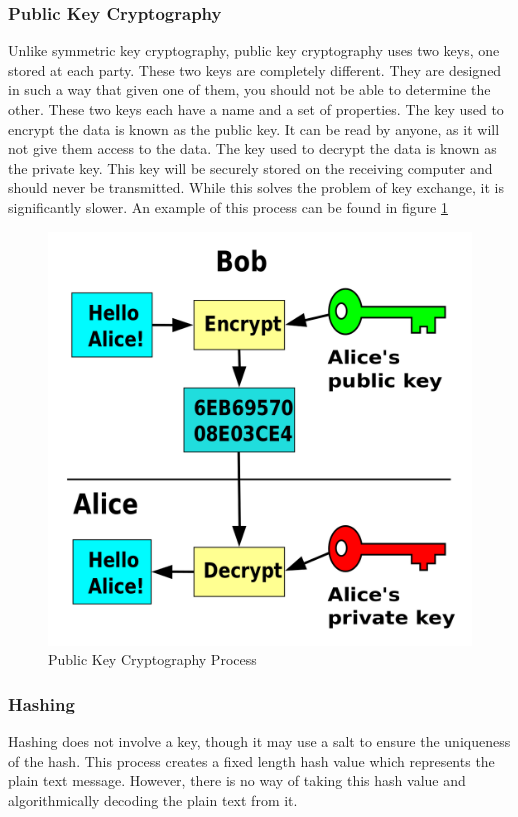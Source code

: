 \documentclass[a4paper,11pt]{report}
\begin{document}
			\subsubsection{Public Key Cryptography}
				Unlike symmetric key cryptography, public key cryptography uses two keys, one stored at each party. 
				These two keys are completely different. 
				They are designed in such a way that given one of them, you should not be able to determine the other. 
				These two keys each have a name and a set of properties. 
				The key used to encrypt the data is known as the public key. 
				It can be read by anyone, as it will not give them access to the data. 
				The key used to decrypt the data is known as the private key. 
				This key will be securely stored on the receiving computer and should never be transmitted. 
				While this solves the problem of key exchange, it is significantly slower. 
				An example of this process can be found in figure \ref{fig:PublicKey}
				\begin{figure}[htb]
					\centering
					\includegraphics[scale=0.25]{./PublicKey.png}
					\caption{Public Key Cryptography Process}
					\label{fig:PublicKey}
				\end{figure}
			\subsubsection{Hashing}
				Hashing does not involve a key, though it may use a salt to ensure the uniqueness of the hash. 
				This process creates a fixed length hash value which represents the plain text message. 
				However, there is no way of taking this hash value and algorithmically decoding the plain text from it. 
\end{document}
